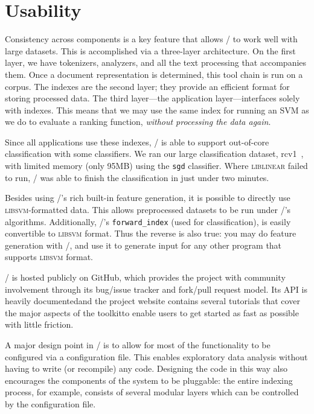 \section{Usability}

Consistency across components is a key feature that allows \meta/ to work
well with large datasets. This is accomplished via a three-layer architecture.
On the first layer, we have tokenizers, analyzers, and all the text processing
that accompanies them. Once a document representation is determined, this tool
chain is run on a corpus. The indexes are the second layer; they provide an
efficient format for storing processed data. The third layer---the application
layer---interfaces solely with indexes. This means that we may use the same
index for running an SVM as we do to evaluate a ranking function, \emph{without
processing the data again}.

Since all applications use these indexes, \meta/ is able to support
out-of-core classification with some classifiers. We ran our large
classification dataset, rcv1~\cite{rcv1}, with limited memory (only 95MB) using
the \texttt{sgd} classifier.
Where \textsc{liblinear} failed to run,
\meta/ was able to finish the classification in just under two minutes.

Besides using \meta/'s rich built-in feature generation, it is possible to
directly use \textsc{libsvm}-formatted data. This allows preprocessed datasets
to be run under \meta/'s algorithms. Additionally, \meta/'s
\texttt{forward\_index} (used for classification), is easily convertible to
\textsc{libsvm} format. Thus the reverse is also true: you may do feature
generation with \meta/, and use it to generate input for any other program that
supports \textsc{libsvm} format.

\meta/ is hosted publicly on GitHub\footnotemark[1], which provides
the project with community involvement through its bug/issue tracker and
fork/pull request model. Its API is heavily documented\footnotemark[2] and the
project website contains several tutorials that cover the major aspects of
the toolkit\footnotemark[3] to enable users to get started as fast as
possible with little friction.


A major design point in \meta/ is to allow for most of the functionality to be
configured via a configuration file. This enables exploratory data analysis
without having to write (or recompile) any code. Designing the code in this way
also encourages the components of the system to be pluggable: the entire
indexing process, for example, consists of several modular layers which can be
controlled by the configuration file.


